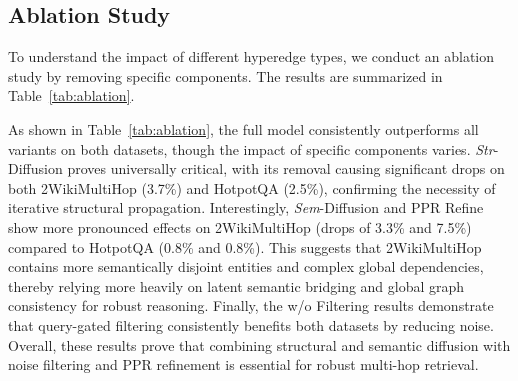 \subsection{Ablation Study}
To understand the impact of different hyperedge types, we conduct an ablation study by removing specific components. The results are summarized in Table~\ref{tab:ablation}.

\begin{table}[ht]
\centering
{}
\vspace{-1mm}
\caption{Ablation study results (LLM-Acc). \textit{Sem} means semantic and \textit{Str} means structural.}
\label{tab:ablation}
\vspace{-3mm}
\end{table}

As shown in Table~\ref{tab:ablation}, the full \EHGRAG model consistently outperforms all variants on both datasets, though the impact of specific components varies. \textit{Str}-Diffusion proves universally critical, with its removal causing significant drops on both 2WikiMultiHop (3.7\%) and HotpotQA (2.5\%), confirming the necessity of iterative structural propagation. Interestingly, \textit{Sem}-Diffusion and PPR Refine show more pronounced effects on 2WikiMultiHop (drops of 3.3\% and 7.5\%) compared to HotpotQA (0.8\% and 0.8\%). This suggests that 2WikiMultiHop contains more semantically disjoint entities and complex global dependencies, thereby relying more heavily on latent semantic bridging and global graph consistency for robust reasoning. Finally, the w/o Filtering results demonstrate that query-gated filtering consistently benefits both datasets by reducing noise. Overall, these results prove that combining structural and semantic diffusion with noise filtering and PPR refinement is essential for robust multi-hop retrieval.

